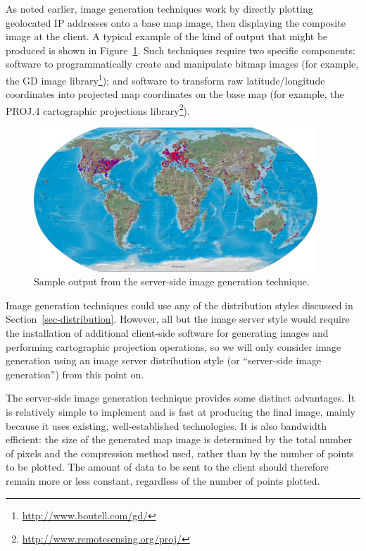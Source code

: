 \documentclass[acmtocl,acmnow]{acmtrans2m}
\begin{document}
As noted earlier, image generation techniques work by directly plotting
geolocated IP addresses onto a base map image, then displaying the
composite image at the client. A typical example of the kind of output
that might be produced is shown in Figure~\ref{fig-image}. Such
techniques require two specific components: software to programmatically
create and manipulate bitmap images (for example, the GD image
library\footnote{\url{http://www.boutell.com/gd/}}); and software to
transform raw latitude/longitude coordinates into projected map
coordinates on the base map (for example, the PROJ.4 cartographic
projections library\footnote{\url{http://www.remotesensing.org/proj/}}).


\begin{figure}
	\centering
	\includegraphics[width=0.95\textwidth,keepaspectratio]{ImageGeneration-full}
	\caption{Sample output from the server-side image generation technique.}
	\label{fig-image}
\end{figure}


Image generation techniques could use any of the distribution styles
discussed in Section~\ref{sec-distribution}. However, all but the image
server style would require the installation of additional client-side
software for generating images and performing cartographic projection
operations, so we will only consider image generation using an image
server distribution style (or ``server-side image generation'') from
this point on.

The server-side image generation technique provides some distinct
advantages. It is relatively simple to implement and is fast at
producing the final image, mainly because it uses existing,
well-established technologies. It is also bandwidth efficient: the size
of the generated map image is determined by the total number of pixels
and the compression method used, rather than by the number of points to
be plotted. The amount of data to be sent to the client should therefore
remain more or less constant, regardless of the number of points
plotted.
\end{document}
